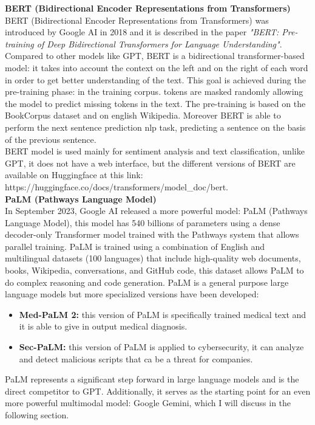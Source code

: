 \textbf{BERT (Bidirectional Encoder Representations from Transformers)}\\
BERT (Bidirectional Encoder Representations from Transformers) was introduced by Google AI in 2018 and it is described in the paper \textit{"BERT: Pre-training of Deep Bidirectional Transformers for Language Understanding"}.\cite{kenton2019bert} Compared to other models like GPT, BERT is a bidirectional transformer-based model: it takes into account the context on the left and on the right of each word in order to get better understanding of the text. This goal is achieved during the pre-training phase: in the training corpus. tokens are masked randomly allowing the model to predict missing tokens in the text. The pre-training is based on the BookCorpus dataset\cite{bandy2021addressing} and on english Wikipedia. Moreover BERT is able to perform the next sentence prediction nlp task\cite{shi2019next}, predicting a sentence on the basis of the previous sentence.\\
BERT model is used mainly for sentiment analysis and text classification, unlike GPT, it does not have a web interface, but the different versions of BERT are available on Huggingface at this link:\\ https://huggingface.co/docs/transformers/model\_doc/bert.\\

\textbf{PaLM (Pathways Language Model)}\\
In September 2023, Google AI released a more powerful model: PaLM (Pathways Language Model), this model has 540 billions of parameters using a dense decoder-only Transformer model trained with the Pathways system that allows parallel training. \cite{anil2023palm}\cite{barham2022pathways}
PaLM is trained  using a combination of English and multilingual datasets (100 languages) that include high-quality web documents, books, Wikipedia, conversations, and GitHub code, this dataset allows PaLM to do complex reasoning and code generation.\cite{palm2_intro} PaLM is a general purpose large language models but more specialized versions have been developed: 
\begin{itemize}
    \item \textbf{Med-PaLM 2:} this version of PaLM is specifically trained medical text and it is able to give in output medical diagnosis. 
    \item \textbf{Sec-PaLM:} this version of PaLM is applied to cybersecurity, it can analyze and detect malicious scripts that ca be a threat for companies.
\end{itemize}
PaLM represents a significant step forward in large language models and is the direct competitor to GPT. Additionally, it serves as the starting point for an even more powerful multimodal model: Google Gemini, which I will discuss in the following section.\\

